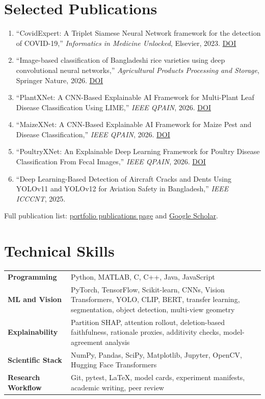 \documentclass[10pt,a4paper]{article}
\begin{document}
\section{Selected Publications}
\small
\begin{enumerate}[leftmargin=1.5em,itemsep=2pt,topsep=2pt]
  \item ``CovidExpert: A Triplet Siamese Neural Network framework for the detection of COVID-19,'' \textit{Informatics in Medicine Unlocked}, Elsevier, 2023. \href{https://doi.org/10.1016/j.imu.2022.101156}{DOI}
  \item ``Image-based classification of Bangladeshi rice varieties using deep convolutional neural networks,'' \textit{Agricultural Products Processing and Storage}, Springer Nature, 2026. \href{https://doi.org/10.1007/s44462-026-00061-9}{DOI}
  \item ``PlantXNet: A CNN-Based Explainable AI Framework for Multi-Plant Leaf Disease Classification Using LIME,'' \textit{IEEE QPAIN}, 2026. \href{https://doi.org/10.1109/QPAIN69676.2026.11545914}{DOI}
  \item ``MaizeXNet: A CNN-Based Explainable AI Framework for Maize Pest and Disease Classification,'' \textit{IEEE QPAIN}, 2026. \href{https://doi.org/10.1109/QPAIN69676.2026.11546210}{DOI}
  \item ``PoultryXNet: An Explainable Deep Learning Framework for Poultry Disease Classification From Fecal Images,'' \textit{IEEE QPAIN}, 2026. \href{https://doi.org/10.1109/QPAIN69676.2026.11545990}{DOI}
  \item ``Deep Learning-Based Detection of Aircraft Cracks and Dents Using YOLOv11 and YOLOv12 for Aviation Safety in Bangladesh,'' \textit{IEEE ICCCNT}, 2025.
\end{enumerate}
\normalsize
Full publication list: \href{https://gourabroy551.github.io/publications.html}{portfolio publications page} and \href{https://scholar.google.com/citations?hl=en\&user=_9tL56YAAAAJ}{Google Scholar}.

\section{Technical Skills}
\begin{tabularx}{\textwidth}{@{}>{\bfseries}l X@{}}
Programming & Python, MATLAB, C, C++, Java, JavaScript \\
ML and Vision & PyTorch, TensorFlow, Scikit-learn, CNNs, Vision Transformers, YOLO, CLIP, BERT, transfer learning, segmentation, object detection, multi-view geometry \\
Explainability & Partition SHAP, attention rollout, deletion-based faithfulness, rationale proxies, additivity checks, model-agreement analysis \\
Scientific Stack & NumPy, Pandas, SciPy, Matplotlib, Jupyter, OpenCV, Hugging Face Transformers \\
Research Workflow & Git, pytest, LaTeX, model cards, experiment manifests, academic writing, peer review \\
\end{tabularx}
\end{document}
